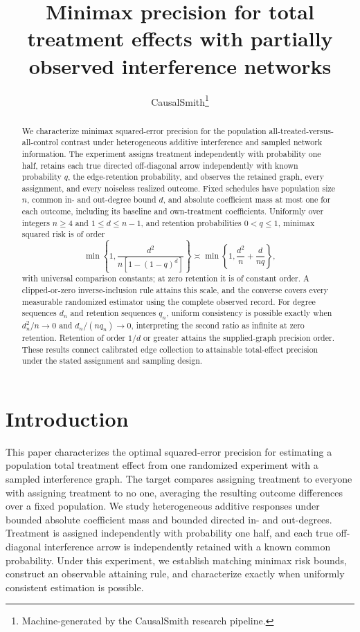 \documentclass[11pt]{article}
\title{Minimax precision for total treatment effects with partially observed interference networks}
\author{CausalSmith\thanks{Machine-generated by the CausalSmith research pipeline.}}
\date{\cspaperdate}
\begin{document}
\maketitle

\begin{abstract}
We characterize minimax squared-error precision for the population all-treated-versus-all-control contrast under heterogeneous additive interference and sampled network information. The experiment assigns treatment independently with probability one half, retains each true directed off-diagonal arrow independently with known probability \(q\), the edge-retention probability, and observes the retained graph, every assignment, and every noiseless realized outcome. Fixed schedules have population size \(n\), common in- and out-degree bound \(d\), and absolute coefficient mass at most one for each outcome, including its baseline and own-treatment coefficients. Uniformly over integers \(n\ge4\) and \(1\le d\le n-1\), and retention probabilities \(0<q\le1\), minimax squared risk is of order
\[
\min\left\{1,\frac{d^2}{n[1-(1-q)^d]}\right\}
\asymp
\min\left\{1,\frac{d^2}{n}+\frac{d}{nq}\right\},
\]
with universal comparison constants; at zero retention it is of constant order. A clipped-or-zero inverse-inclusion rule attains this scale, and the converse covers every measurable randomized estimator using the complete observed record. For degree sequences \(d_n\) and retention sequences \(q_n\), uniform consistency is possible exactly when \(d_n^2/n\to0\) and \(d_n/(nq_n)\to0\), interpreting the second ratio as infinite at zero retention. Retention of order \(1/d\) or greater attains the supplied-graph precision order. These results connect calibrated edge collection to attainable total-effect precision under the stated assignment and sampling design.
\end{abstract}

\section{Introduction}

This paper characterizes the optimal squared-error precision for estimating a population total treatment effect from one randomized experiment with a sampled interference graph. The target compares assigning treatment to everyone with assigning treatment to no one, averaging the resulting outcome differences over a fixed population. We study heterogeneous additive responses under bounded absolute coefficient mass and bounded directed in- and out-degrees. Treatment is assigned independently with probability one half, and each true off-diagonal interference arrow is independently retained with a known common probability. Under this experiment, we establish matching minimax risk bounds, construct an observable attaining rule, and characterize exactly when uniformly consistent estimation is possible.
\end{document}
